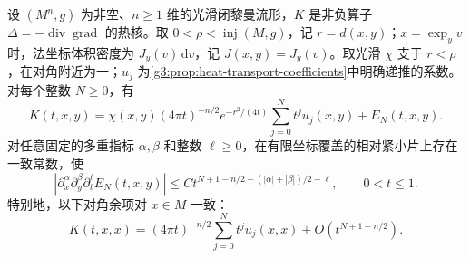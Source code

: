 \begin{theorem}\label{g3:thm:heat-parametrix-expansion}
	设 \((M^n,g)\) 为非空、\(n\ge1\) 维的光滑闭黎曼流形，\(K\) 是非负算子 \(\Delta=-\operatorname{div}\operatorname{grad}\) 的热核。取 \(0<\rho<\operatorname{inj}(M,g)\)，记 \(r=d(x,y)\)；\(x=\exp_yv\) 时，法坐标体积密度为 \(J_y(v)\,\mathrm dv\)，记 \(J(x,y)=J_y(v)\)。取光滑 \(\chi\) 支于 \(r<\rho\)，在对角附近为一；\(u_j\) 为\cref{g3:prop:heat-transport-coefficients}中明确递推的系数。对每个整数 \(N\ge0\)，有
	\begin{equation}\label{g3:eq:heat-parametrix-expansion}
		K(t,x,y)=\chi(x,y)(4\pi t)^{-n/2}e^{-r^2/(4t)}
		\sum_{j=0}^Nt^ju_j(x,y)+E_N(t,x,y).
	\end{equation}
	对任意固定的多重指标 \(\alpha,\beta\) 和整数 \(\ell\ge0\)，在有限坐标覆盖的相对紧小片上存在一致常数，使
	\begin{equation}\label{g3:eq:heat-parametrix-derivative-remainder}
		|\partial_x^\alpha\partial_y^\beta\partial_t^\ell E_N(t,x,y)|
		\le Ct^{N+1-n/2-(|\alpha|+|\beta|)/2-\ell},
		\qquad 0<t\le1.
	\end{equation}
	特别地，以下对角余项对 \(x\in M\) 一致：
	\begin{equation}\label{g3:eq:heat-diagonal-uniform-remainder}
		K(t,x,x)=(4\pi t)^{-n/2}\sum_{j=0}^Nt^ju_j(x,x)
		+O(t^{N+1-n/2}).
	\end{equation}
\end{theorem}
